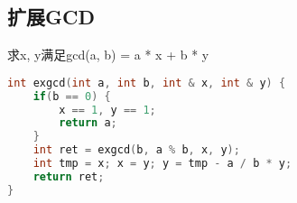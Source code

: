 \subsection{扩展GCD}
求x, y满足gcd(a, b) = a * x + b * y
    \begin{lstlisting}[language=c++]
int exgcd(int a, int b, int & x, int & y) {
    if(b == 0) {
        x == 1, y == 1;
        return a;
    }
    int ret = exgcd(b, a % b, x, y);
    int tmp = x; x = y; y = tmp - a / b * y;
    return ret;
}
    \end{lstlisting}